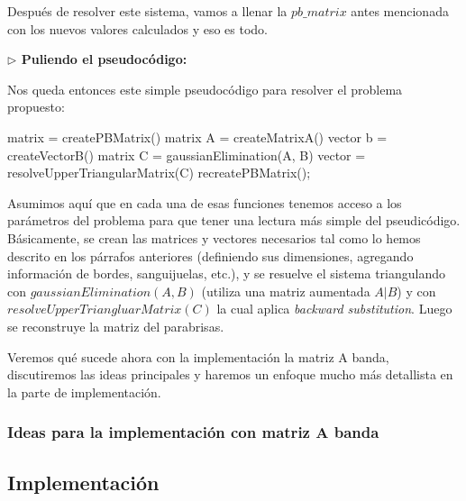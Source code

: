 \vspace{\baselineskip}

Después de resolver este sistema, vamos a llenar la $pb\_matrix$ antes mencionada con los nuevos valores calculados y eso es todo.

\vspace{\baselineskip}
\vspace{\baselineskip}

{\large \textbf{ $\rhd$ Puliendo el pseudocódigo:}}

\vspace{\baselineskip}

Nos queda entonces este simple pseudocódigo para resolver el problema propuesto:

\vspace{\baselineskip}
\begin{codebox}
\li matrix  = createPBMatrix()
\li matrix \id A = createMatrixA()
\li vector \id b = createVectorB()
\li matrix \id C = gaussianElimination(\id A, \id B)
\li vector  = resolveUpperTriangularMatrix(C)
\li recreatePBMatrix();
\End
\end{codebox} 
\vspace{\baselineskip}

Asumimos aquí que en cada una de esas funciones tenemos acceso a los parámetros del problema para que tener una lectura más simple del pseudicódigo. Básicamente, se crean las matrices y vectores necesarios tal como lo hemos descrito en los párrafos anteriores (definiendo sus dimensiones, agregando información de bordes, sanguijuelas, etc.), y se resuelve el sistema triangulando con $gaussianElimination(A,B)$ (utiliza una matriz aumentada $A|B$) y con $resolveUpperTriangluarMatrix(C)$ la cual aplica \textit{backward substitution}. Luego se reconstruye la matriz del parabrisas.

\vspace{\baselineskip}
\par
Veremos qué sucede ahora con la implementación la matriz A banda, discutiremos las ideas principales y haremos un enfoque mucho más detallista en la parte de implementación.

\subsubsection{Ideas para la implementación con matriz A banda}

\subsection{Implementación}

